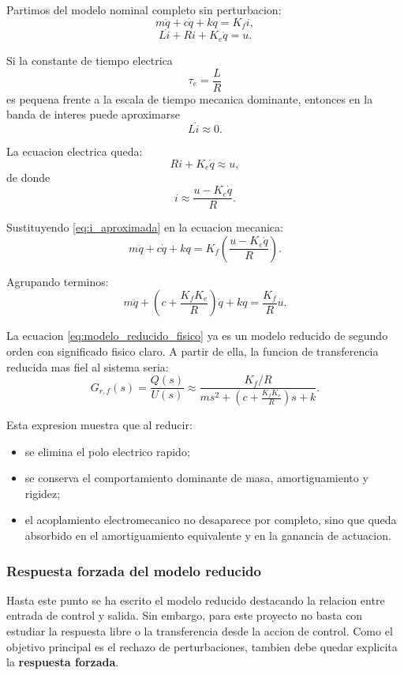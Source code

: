 \documentclass[11pt]{article}
\begin{document}
Partimos del modelo nominal completo sin perturbacion:
\[
m\ddot q + c\dot q + kq = K_f i,
\]
\[
L\dot i + Ri + K_e\dot q = u.
\]

Si la constante de tiempo electrica
\[
\tau_e=\frac{L}{R}
\]
es pequena frente a la escala de tiempo mecanica dominante, entonces en la banda de interes puede aproximarse
\[
L\dot i \approx 0.
\]

La ecuacion electrica queda:
\[
Ri + K_e\dot q \approx u,
\]
de donde
\begin{equation}
i \approx \frac{u-K_e\dot q}{R}.
\label{eq:i_aproximada}
\end{equation}

Sustituyendo \eqref{eq:i_aproximada} en la ecuacion mecanica:
\[
m\ddot q + c\dot q + kq = K_f\left(\frac{u-K_e\dot q}{R}\right).
\]

Agrupando terminos:
\begin{equation}
m\ddot q + \left(c+\frac{K_fK_e}{R}\right)\dot q + kq = \frac{K_f}{R}u.
\label{eq:modelo_reducido_fisico}
\end{equation}

La ecuacion \eqref{eq:modelo_reducido_fisico} ya es un modelo reducido de segundo orden con significado fisico claro. A partir de ella, la funcion de transferencia reducida mas fiel al sistema seria:
\begin{equation}
G_{r,f}(s)=\frac{Q(s)}{U(s)}\approx \frac{K_f/R}{ms^2+\left(c+\frac{K_fK_e}{R}\right)s+k}.
\label{eq:tf_reducida_fisica}
\end{equation}

Esta expresion muestra que al reducir:

\begin{itemize}[leftmargin=1.2cm]
\item se elimina el polo electrico rapido;
\item se conserva el comportamiento dominante de masa, amortiguamiento y rigidez;
\item el acoplamiento electromecanico no desaparece por completo, sino que queda absorbido en el amortiguamiento equivalente y en la ganancia de actuacion.
\end{itemize}

\subsubsection{Respuesta forzada del modelo reducido}

Hasta este punto se ha escrito el modelo reducido destacando la relacion entre entrada de control y salida. Sin embargo, para este proyecto no basta con estudiar la respuesta libre o la transferencia desde la accion de control. Como el objetivo principal es el rechazo de perturbaciones, tambien debe quedar explicita la \textbf{respuesta forzada}.
\end{document}
